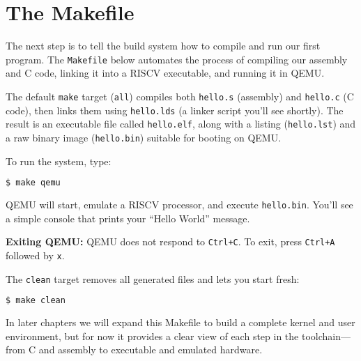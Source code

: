 \section{The Makefile}

The next step is to tell the build system how to compile and run our first
program.  The \texttt{Makefile} below automates the process of compiling our
assembly and C code, linking it into a RISC\textendash V executable, and running
it in QEMU.

\begin{figure}[H]
\centering
\begin{minipage}{0.95\textwidth}

\end{minipage}
\end{figure}

The default \texttt{make} target (\texttt{all}) compiles both
\texttt{hello.s} (assembly) and \texttt{hello.c} (C code), then links them
using \texttt{hello.lds} (a linker script you’ll see shortly).  The result is an
executable file called \texttt{hello.elf}, along with a listing
(\texttt{hello.lst}) and a raw binary image (\texttt{hello.bin}) suitable for
booting on QEMU.

To run the system, type:

\begin{lstlisting}[style=oscode,language=bash]
$ make qemu
\end{lstlisting}

QEMU will start, emulate a RISC\textendash V processor, and execute
\texttt{hello.bin}.  You’ll see a simple console that prints your
``Hello World'' message.

\medskip
\noindent
\textbf{Exiting QEMU:}  
QEMU does not respond to \texttt{Ctrl+C}.  
To exit, press \texttt{Ctrl+A} followed by \texttt{x}.

\medskip
The \texttt{clean} target removes all generated files and lets you start fresh:

\begin{lstlisting}[style=oscode,language=bash]
$ make clean
\end{lstlisting}

In later chapters we will expand this Makefile to build a complete kernel and
user environment, but for now it provides a clear view of each step in the
toolchain—from C and assembly to executable and emulated hardware.
